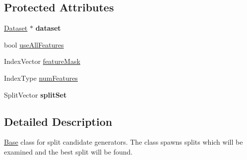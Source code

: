 \subsection*{Protected Attributes}
\begin{DoxyCompactItemize}
\item 
\hypertarget{classffactory_1_1_base_split_candidate_generator_a4df63e753be1dca1c2ffca46d8609148}{\hyperlink{classffactory_1_1_dataset}{Dataset} $\ast$ {\bfseries dataset}}\label{classffactory_1_1_base_split_candidate_generator_a4df63e753be1dca1c2ffca46d8609148}

\item 
bool \hyperlink{classffactory_1_1_base_split_candidate_generator_afe4971fb46570d6658dad28eefe6d52c}{use\-All\-Features}
\item 
Index\-Vector \hyperlink{classffactory_1_1_base_split_candidate_generator_a7ce11df8208d85d2da2914e41ab3467c}{feature\-Mask}
\item 
Index\-Type \hyperlink{classffactory_1_1_base_split_candidate_generator_a418bcf78922a3d288de0ae3ec55553a6}{num\-Features}
\item 
\hypertarget{classffactory_1_1_base_split_candidate_generator_ad7d567911eda56ede547463b773b18d2}{Split\-Vector {\bfseries split\-Set}}\label{classffactory_1_1_base_split_candidate_generator_ad7d567911eda56ede547463b773b18d2}

\end{DoxyCompactItemize}


\subsection{Detailed Description}
\hyperlink{classffactory_1_1_base}{Base} class for split candidate generators. The class spawns splits which will be examined and the best split will be found. 

